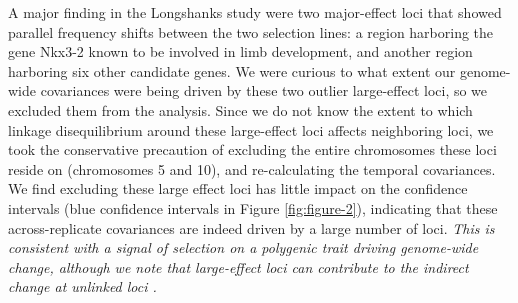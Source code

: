 \documentclass[11pt]{article}
\newcommand{\vb}[1]{{\it \color{blue} #1}}
\begin{document}
A major finding in the Longshanks study were two major-effect loci that showed
parallel frequency shifts between the two selection lines: a region harboring
the gene Nkx3-2 known to be involved in limb development, and another region
harboring six other candidate genes. We were curious to what extent our
genome-wide covariances were being driven by these two outlier large-effect
loci, so we excluded them from the analysis. Since we do not know the extent to
which linkage disequilibrium around these large-effect loci affects neighboring
loci, we took the conservative precaution of excluding the entire chromosomes
these loci reside on (chromosomes 5 and 10), and re-calculating the temporal
covariances. We find excluding these large effect loci has little impact on the
confidence intervals (blue confidence intervals in Figure \ref{fig:figure-2}),
indicating that these across-replicate covariances are indeed driven by a large
number of loci. \vb{This is consistent with a signal of selection on a
  polygenic trait driving genome-wide change, although we note that
  large-effect loci can contribute to the indirect change at unlinked loci
\parencite{Robertson1961-ho,Santiago1995-hx}. }
\end{document}
